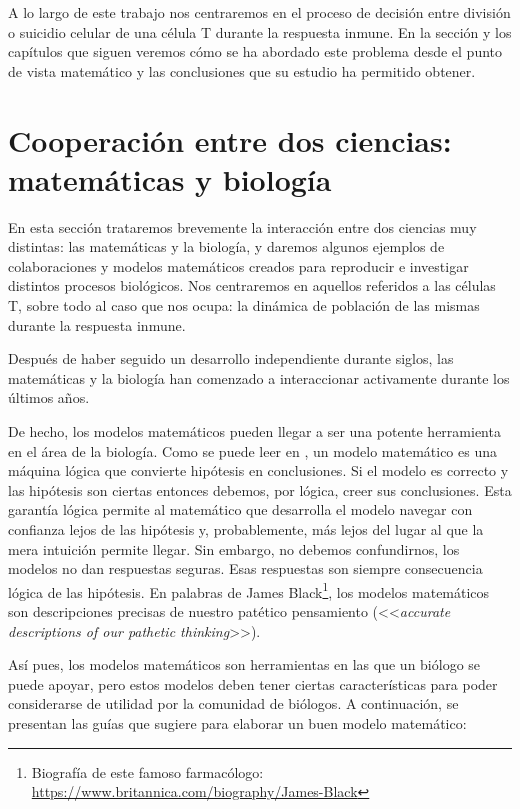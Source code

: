 A lo largo de este trabajo nos centraremos en el proceso de decisión entre división o suicidio celular de una célula T durante la respuesta inmune. En la sección y los capítulos que siguen veremos cómo se ha abordado este problema desde el punto de vista matemático y las conclusiones que su estudio ha permitido obtener. 


\section{Cooperación entre dos ciencias: matemáticas y biología}
\label{sec:coop}

En esta sección trataremos brevemente la interacción entre dos ciencias muy distintas: las matemáticas y la biología, y daremos algunos ejemplos de colaboraciones y modelos matemáticos creados para reproducir e investigar distintos procesos biológicos. Nos centraremos en aquellos referidos a las células T, sobre todo al caso que nos ocupa: la dinámica de población de las mismas durante la respuesta inmune.

Después de haber seguido un desarrollo independiente durante siglos, las matemáticas y la biología han comenzado a interaccionar activamente durante los últimos años.


De hecho, los modelos matemáticos pueden llegar a ser una potente herramienta en el área de la biología. Como se puede leer en \cite{Gunawardena2014}, un modelo matemático es una máquina lógica que convierte hipótesis en conclusiones. Si el modelo es correcto y las hipótesis son ciertas entonces debemos, por lógica, creer sus conclusiones. Esta garantía lógica permite al matemático que desarrolla el modelo navegar con confianza lejos de las hipótesis y, probablemente, más lejos del lugar al que la mera intuición permite llegar. Sin embargo, no debemos confundirnos, los modelos no dan respuestas seguras. Esas respuestas son siempre consecuencia lógica de las hipótesis. En palabras de James Black\footnote{Biografía de este famoso farmacólogo: \url{https://www.britannica.com/biography/James-Black}}, los modelos matemáticos son descripciones precisas de nuestro patético pensamiento (<<\textit{accurate descriptions of our pathetic thinking}>>).

Así pues, los modelos matemáticos son herramientas en las que un biólogo se puede apoyar, pero estos modelos deben tener ciertas características para poder considerarse de utilidad por la comunidad de biólogos. A continuación, se presentan las guías que sugiere \cite{Gunawardena2014} para elaborar un buen modelo matemático:

